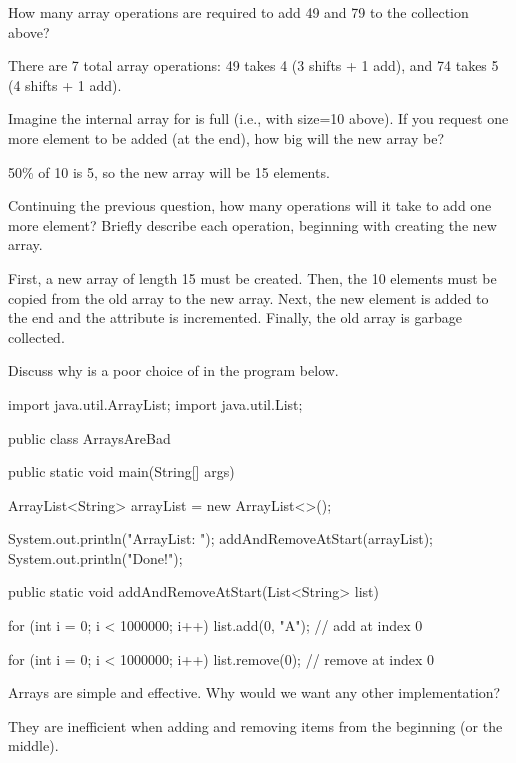 \Q How many array operations are required to add 49 and 79 to the  collection above?

\begin{answer}
There are 7 total array operations:
49 takes 4 (3 shifts + 1 add), and 74 takes 5 (4 shifts + 1 add).
\end{answer}


\Q Imagine the internal array for  is full (i.e., with size=10 above).
If you request one more element to be added (at the end), how big will the new array be?

\begin{answer}
50\% of 10 is 5, so the new array will be 15 elements.
\end{answer}


\Q Continuing the previous question, how many operations will it take to add one more element? Briefly describe each operation, beginning with creating the new array.

\begin{answer}[5em]
First, a new array of length 15 must be created.
Then, the 10 elements must be copied from the old array to the new array.
Next, the new element is added to the end and the  attribute is incremented.
Finally, the old array is garbage collected.
\end{answer}


\Q Discuss why  is a poor choice of  in the program below.

\begin{javabox}
import java.util.ArrayList;
import java.util.List;

public class ArraysAreBad
{
    public static void main(String[] args)
    {
        ArrayList<String> arrayList = new ArrayList<>();

        System.out.println("ArrayList: ");
        addAndRemoveAtStart(arrayList);
        System.out.println("Done!");
    }

    public static void addAndRemoveAtStart(List<String> list)
    {
        for (int i = 0; i < 1000000; i++)
        {
            list.add(0, "A");  // add at index 0
        }

        for (int i = 0; i < 1000000; i++)
        {
            list.remove(0);  // remove at index 0
        }
    }
}
\end{javabox}


\Q Arrays are simple and effective. Why would we want any other implementation?

\begin{answer}
They are inefficient when adding and removing items from the beginning (or the middle).
\end{answer}

